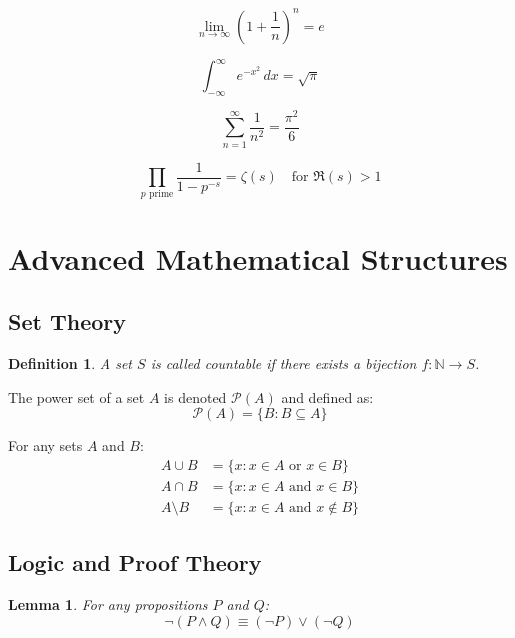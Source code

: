\documentclass[12pt]{article}
\newtheorem{lemma}{Lemma}
\newtheorem{definition}{Definition}
\begin{document}
\begin{equation}
\lim_{n \to \infty} \left(1 + \frac{1}{n}\right)^n = e
\end{equation}

\begin{equation}
\int_{-\infty}^{\infty} e^{-x^2} \, dx = \sqrt{\pi}
\end{equation}

\begin{equation}
\sum_{n=1}^{\infty} \frac{1}{n^2} = \frac{\pi^2}{6}
\end{equation}

\begin{equation}
\prod_{p \text{ prime}} \frac{1}{1-p^{-s}} = \zeta(s) \quad \text{for } \Re(s) > 1
\end{equation}

\section{Advanced Mathematical Structures}

\subsection{Set Theory}

\begin{definition}
A set $S$ is called \emph{countable} if there exists a bijection $f: \mathbb{N} \to S$.
\end{definition}

The power set of a set $A$ is denoted $\mathcal{P}(A)$ and defined as:
\begin{equation}
\mathcal{P}(A) = \{B : B \subseteq A\}
\end{equation}

For any sets $A$ and $B$:
\begin{align}
A \cup B &= \{x : x \in A \text{ or } x \in B\} \\
A \cap B &= \{x : x \in A \text{ and } x \in B\} \\
A \setminus B &= \{x : x \in A \text{ and } x \notin B\}
\end{align}

\subsection{Logic and Proof Theory}

\begin{lemma}
For any propositions $P$ and $Q$:
\begin{equation}
\neg(P \land Q) \equiv (\neg P) \lor (\neg Q)
\end{equation}
\end{lemma}
\end{document}
